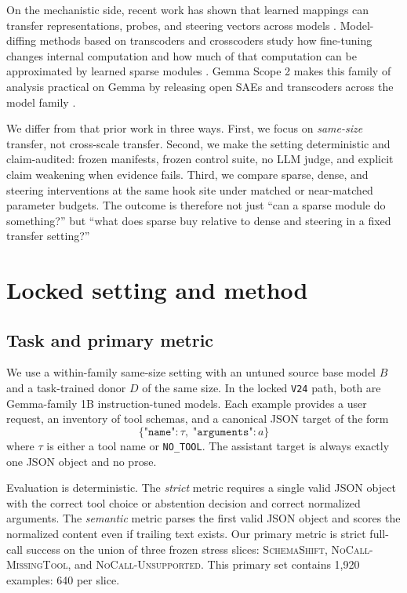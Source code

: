 \documentclass{article}
\begin{document}
On the mechanistic side, recent work has shown that learned mappings can transfer representations, probes, and steering vectors across models \citep{chen2025stitching, oozeer2025activationtransfer}. Model-diffing methods based on transcoders and crosscoders study how fine-tuning changes internal computation and how much of that computation can be approximated by learned sparse modules \citep{paulo2025transcoders, hu2026transcoderadapters, kassem2026deltacrosscoder}. Gemma Scope 2 makes this family of analysis practical on Gemma by releasing open SAEs and transcoders across the model family \citep{google2025gemmascope, deepmind2025gemmascopeblog}.

We differ from that prior work in three ways. First, we focus on \emph{same-size} transfer, not cross-scale transfer. Second, we make the setting deterministic and claim-audited: frozen manifests, frozen control suite, no LLM judge, and explicit claim weakening when evidence fails. Third, we compare sparse, dense, and steering interventions at the same hook site under matched or near-matched parameter budgets. The outcome is therefore not just ``can a sparse module do something?'' but ``what does sparse buy relative to dense and steering in a fixed transfer setting?''

\section{Locked setting and method}
\subsection{Task and primary metric}
We use a within-family same-size setting with an untuned source base model $B$ and a task-trained donor $D$ of the same size. In the locked \texttt{V24} path, both are Gemma-family 1B instruction-tuned models. Each example provides a user request, an inventory of tool schemas, and a canonical JSON target of the form
\begin{equation}
\{\texttt{"name"}: \tau,\; \texttt{"arguments"}: a\}
\end{equation}
where $\tau$ is either a tool name or \texttt{NO\_TOOL}. The assistant target is always exactly one JSON object and no prose.

Evaluation is deterministic. The \emph{strict} metric requires a single valid JSON object with the correct tool choice or abstention decision and correct normalized arguments. The \emph{semantic} metric parses the first valid JSON object and scores the normalized content even if trailing text exists. Our primary metric is strict full-call success on the union of three frozen stress slices: \textsc{SchemaShift}, \textsc{NoCall-MissingTool}, and \textsc{NoCall-Unsupported}. This primary set contains 1,920 examples: 640 per slice.
\end{document}
